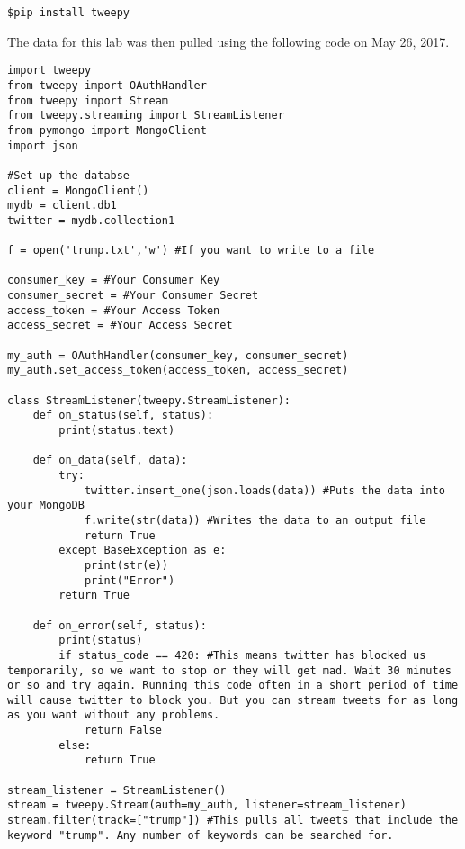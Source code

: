 \begin{lstlisting}
$pip install tweepy
\end{lstlisting}

The data for this lab was then pulled using the following code on May 26, 2017.

\begin{lstlisting}
import tweepy
from tweepy import OAuthHandler
from tweepy import Stream
from tweepy.streaming import StreamListener
from pymongo import MongoClient
import json

#Set up the databse
client = MongoClient()
mydb = client.db1
twitter = mydb.collection1

f = open('trump.txt','w') #If you want to write to a file

consumer_key = #Your Consumer Key
consumer_secret = #Your Consumer Secret
access_token = #Your Access Token
access_secret = #Your Access Secret

my_auth = OAuthHandler(consumer_key, consumer_secret)
my_auth.set_access_token(access_token, access_secret)

class StreamListener(tweepy.StreamListener):
    def on_status(self, status):
        print(status.text)

    def on_data(self, data):
        try:
            twitter.insert_one(json.loads(data)) #Puts the data into your MongoDB
            f.write(str(data)) #Writes the data to an output file
            return True
        except BaseException as e:
            print(str(e))
            print("Error")
        return True

    def on_error(self, status):
        print(status)
        if status_code == 420: #This means twitter has blocked us temporarily, so we want to stop or they will get mad. Wait 30 minutes or so and try again. Running this code often in a short period of time will cause twitter to block you. But you can stream tweets for as long as you want without any problems.
            return False
        else:
            return True

stream_listener = StreamListener()
stream = tweepy.Stream(auth=my_auth, listener=stream_listener)
stream.filter(track=["trump"]) #This pulls all tweets that include the keyword "trump". Any number of keywords can be searched for.

\end{lstlisting}


